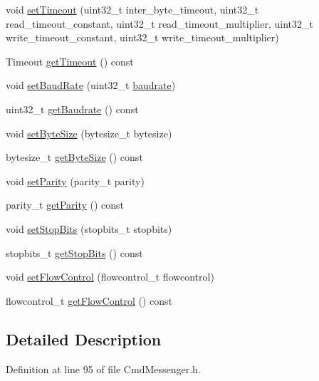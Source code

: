 \begin{DoxyCompactItemize}
\item 
void \hyperlink{classcmd_1_1_cmd_messenger_a0d628c1961f8d2b96fa7081961f6a0c1}{set\+Timeout} (uint32\+\_\+t inter\+\_\+byte\+\_\+timeout, uint32\+\_\+t read\+\_\+timeout\+\_\+constant, uint32\+\_\+t read\+\_\+timeout\+\_\+multiplier, uint32\+\_\+t write\+\_\+timeout\+\_\+constant, uint32\+\_\+t write\+\_\+timeout\+\_\+multiplier)
\item 
Timeout \hyperlink{classcmd_1_1_cmd_messenger_a6b8a4f763475a9e4fbef2237f1050849}{get\+Timeout} () const 
\item 
void \hyperlink{classcmd_1_1_cmd_messenger_a0fc1bac4fc0d3494893113ade503099b}{set\+Baud\+Rate} (uint32\+\_\+t \hyperlink{interbyte_8cpp_ac4f06ea26ed6bd7ae83b92d64ac10b78}{baudrate})
\item 
uint32\+\_\+t \hyperlink{classcmd_1_1_cmd_messenger_a14c580579b5311ff78cce8de34fe63b2}{get\+Baudrate} () const 
\item 
void \hyperlink{classcmd_1_1_cmd_messenger_ae05db8b37c1b2ee9be47ea3a3bf045bd}{set\+Byte\+Size} (bytesize\+\_\+t bytesize)
\item 
bytesize\+\_\+t \hyperlink{classcmd_1_1_cmd_messenger_a8ccc24a1f621afd1e114696ed9b8b261}{get\+Byte\+Size} () const 
\item 
void \hyperlink{classcmd_1_1_cmd_messenger_ae0bbc0b786fadff310f31c84644b56c5}{set\+Parity} (parity\+\_\+t parity)
\item 
parity\+\_\+t \hyperlink{classcmd_1_1_cmd_messenger_ad487f6fd40a2bffc69fab5334d96ab52}{get\+Parity} () const 
\item 
void \hyperlink{classcmd_1_1_cmd_messenger_a06eaedc3c9e7b0b3cda7b139ee61f5bb}{set\+Stop\+Bits} (stopbits\+\_\+t stopbits)
\item 
stopbits\+\_\+t \hyperlink{classcmd_1_1_cmd_messenger_a2dd6e45584ed65ff1f744e46198e7755}{get\+Stop\+Bits} () const 
\item 
void \hyperlink{classcmd_1_1_cmd_messenger_a5271d79b0f4ae95bea5897b214fbbd4c}{set\+Flow\+Control} (flowcontrol\+\_\+t flowcontrol)
\item 
flowcontrol\+\_\+t \hyperlink{classcmd_1_1_cmd_messenger_a11e2bea7282a912fd05644b403b55503}{get\+Flow\+Control} () const 
\end{DoxyCompactItemize}


\subsection{Detailed Description}


Definition at line 95 of file Cmd\+Messenger.\+h.



